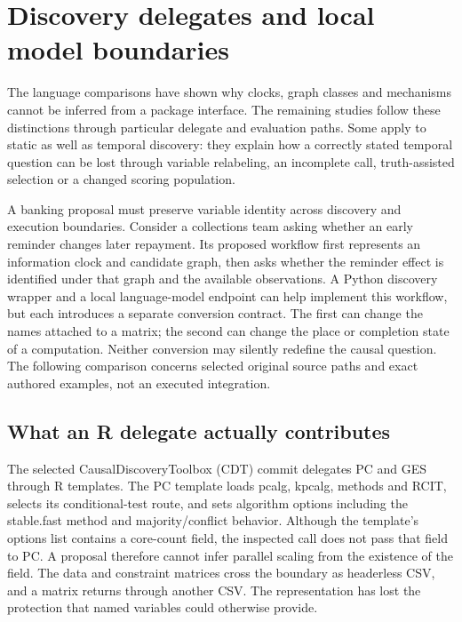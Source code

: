 \section[Discovery delegates and local model boundaries]{Discovery delegates and local model boundaries}
\label{sec:exec28-bp}
The language comparisons have shown why clocks, graph classes and mechanisms
cannot be inferred from a package interface. The remaining studies follow
these distinctions through particular delegate and evaluation paths. Some
apply to static as well as temporal discovery: they explain how a correctly
stated temporal question can be lost through variable relabeling, an
incomplete call, truth-assisted selection or a changed scoring population.

A banking proposal must preserve variable identity across discovery and execution boundaries.
Consider a collections team asking whether an early reminder changes later repayment.
Its proposed workflow first represents an information clock and candidate graph, then asks whether
the reminder effect is identified under that graph and the available observations. A Python
discovery wrapper and a local language-model endpoint can help implement this workflow, but each
introduces a separate conversion contract. The first can change the names attached to a matrix;
the second can change the place or completion state of a computation. Neither conversion may
silently redefine the causal question. The following comparison concerns selected original
source paths and exact authored examples, not an executed integration.

\subsection{What an R delegate actually contributes}
The selected CausalDiscoveryToolbox (CDT) commit delegates PC and GES through R templates.
The PC template loads pcalg, kpcalg, methods and RCIT, selects its conditional-test route, and
sets algorithm options including the stable.fast method and majority/conflict behavior.
Although the template's options list contains a core-count field, the inspected call does not
pass that field to PC. A proposal therefore cannot infer parallel scaling from the existence
of the field. The data and constraint matrices cross the boundary as headerless CSV, and a
matrix returns through another CSV. The representation has lost the protection that named
variables could otherwise provide.~\citep{exec28_bp_cdt}

